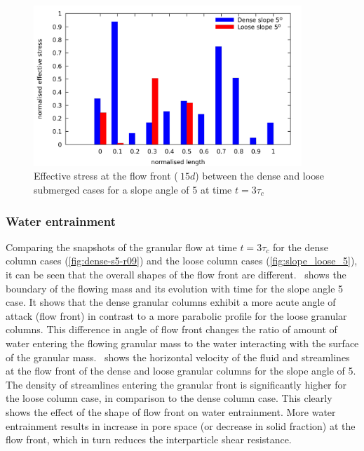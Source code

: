 \documentclass[12pt,twoside]{tuhhproc-en}
\begin{document}
\begin{figure}[htpb]
\centering
\includegraphics[width=0.9\textwidth]{figs/slope-hydroplaning}
\caption{Effective stress at the flow front ($~15d$) between the dense and loose submerged cases for a slope angle of \si{5}{\degree} at time $t = 3\tau_c$}
\label{fig:slope-hydroplaning}
\end{figure}

\subsubsection{Water entrainment}
Comparing the snapshots of the granular flow at time $t=3\tau_c$ for the dense column cases (\cref{fig:dense-s5-r09}) and the loose column cases (\cref{fig:slope_loose_5}), it can be seen that the overall shapes of the flow front are different.~ shows the boundary of the flowing mass and its evolution with time for the slope angle \si{5}{\degree} case. It shows that the dense granular columns exhibit a more acute angle of attack (flow front) in contrast to a more parabolic profile for the loose granular columns. This difference in angle of flow front changes the ratio of amount of water entering the flowing granular mass to the water interacting with the surface of the granular mass.~ shows the horizontal velocity of the fluid and streamlines at the flow front of the dense and loose granular columns for the slope angle of \si{5}{\degree}. The density of streamlines entering the granular front is significantly higher for the loose column case, in comparison to the dense column case. This clearly shows the effect of the shape of flow front on water entrainment. More water entrainment results in increase in pore space (or decrease in solid fraction) at the flow front, which in turn reduces the interparticle shear resistance. 
\end{document}
